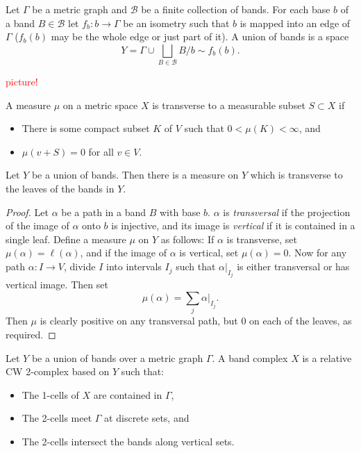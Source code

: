 \begin{definition}
    Let $\Gamma$ be a metric graph and $\mathcal{B}$ be a finite collection of bands. For each base $b$ of a band $B\in \mathcal{B}$ let $f_b:b\rightarrow\Gamma$ be an isometry such that $b$ is mapped into an edge of $\Gamma$ ($f_b(b)$ may be the whole edge or just part of it). A \textnormal{union of bands} is a space \[Y=\Gamma\cup\underset{B\in\mathcal{B}}{\bigsqcup}B/b \sim f_b(b).\] 
\end{definition}
\textcolor{red}{picture!}

\begin{definition}
    A measure $\mu$ on a metric space $X$ is \textnormal{transverse} to a measurable subset $S\subset X$ if 
    \begin{itemize}
        \item There is some compact subset $K$ of $V$ such that $0<\mu(K)<\infty$, and
        \item $\mu(v+S)=0$ for all $v\in V$.
    \end{itemize}
\end{definition}

\begin{lemma}\label{Ymeasure}
    Let $Y$ be a union of bands. Then there is a measure on $Y$ which is transverse to the leaves of the bands in $Y$.
\end{lemma}
\begin{proof}
     Let $\alpha$ be a path in a band $B$ with base $b$. $\alpha$ is \textit{transversal} if the projection of the image of $\alpha$ onto $b$ is injective, and its image is \textit{vertical} if it is contained in a single leaf. Define a measure $\mu$ on $Y$ as follows: If $\alpha$ is transverse, set $\mu(\alpha)=\ell(\alpha)$, and if the image of $\alpha$ is vertical, set $\mu(\alpha)=0$. Now for any path $\alpha:I\rightarrow V$, divide $I$ into intervals $I_j$ such that $\alpha\vert_{I_j}$ is either transversal or has vertical image. Then set \[\mu(\alpha)=\underset{j}\sum\alpha\vert_{I_j}.\] Then $\mu$ is clearly positive on any transversal path, but 0 on each of the leaves, as required.
\end{proof}


\begin{definition}
    Let $Y$ be a union of bands over a metric graph $\Gamma$. A \textnormal{band complex} $X$ is a relative CW 2-complex based on $Y$ such that:
    \begin{itemize}
        \item The 1-cells of $X$ are contained in $\Gamma$,
        \item The 2-cells meet $\Gamma$ at discrete sets, and
        \item The 2-cells intersect the bands along vertical sets.
    \end{itemize}
\end{definition}

